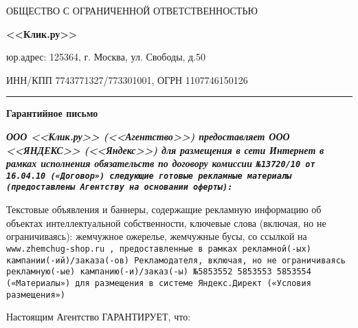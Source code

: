 



\begin{center}
\large{ОБЩЕСТВО С ОГРАНИЧЕННОЙ ОТВЕТСТВЕННОСТЬЮ}

\Huge{\textbf{<<Клик.ру>>}}
\end{center}

\begin{small}
юр.адрес:  125364, г. Москва, ул. Свободы, д.50

ИНН/КПП 7743771327/773301001, ОГРН 1107746150126
\end{small}

\vspace{0.5em}

\hrule height 1pt

\vspace{1em}

\begin{center}\textbf{Гарантийное письмо}\end{center}

\noindent
\bf\sl ООО <<Клик.ру>> \rm (<<Агентство>>) предоставляет
\bf\sl ООО <<ЯНДЕКС>> \rm (<<Яндекс>>) для размещения в сети
Интернет в рамках исполнения обязательств по договору
комиссии \tt №13720/10 \rm от \tt 16.04.10 \rm («Договор») следующие
готовые рекламные материалы (предоставлены Агентству на основании оферты):

\vspace{1em}

\noindent
\rm Текстовые объявления и баннеры, содержащие рекламную информацию об объектах
интеллектуальной собственности, ключевые слова (включая, но не ограничиваясь):
жемчужное ожерелье, жемчужные бусы, со ссылкой на \tt www.zhemchug-shop.ru \rm,
предоставленные в рамках рекламной(-ых) кампании(-ий)/заказа(-ов)
Рекламодателя, включая, но не ограничиваясь рекламную(-ые) кампанию(-и)/заказ(-ы)
\tt №5853552 5853553 5853554 \rm («Материалы») для размещения в
системе Яндекс.Директ («Условия размещения»)

\vspace{1em}

\noindent
Настоящим Агентство ГАРАНТИРУЕТ, что:

